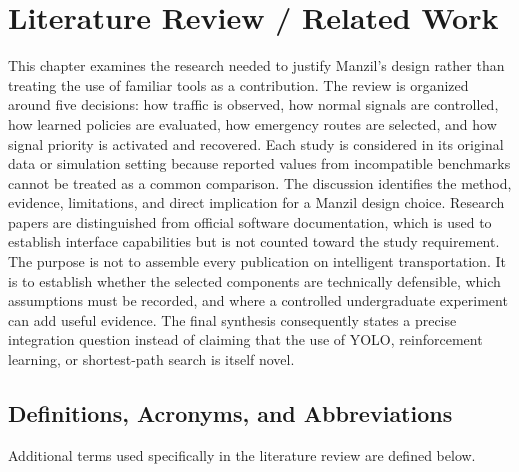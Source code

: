 \chapter{Literature Review / Related Work}
\label{ch:literature}

This chapter examines the research needed to justify Manzil's design rather than treating the use of familiar tools as a contribution. The review is organized around five decisions: how traffic is observed, how normal signals are controlled, how learned policies are evaluated, how emergency routes are selected, and how signal priority is activated and recovered. Each study is considered in its original data or simulation setting because reported values from incompatible benchmarks cannot be treated as a common comparison. The discussion identifies the method, evidence, limitations, and direct implication for a Manzil design choice. Research papers are distinguished from official software documentation, which is used to establish interface capabilities but is not counted toward the study requirement. The purpose is not to assemble every publication on intelligent transportation. It is to establish whether the selected components are technically defensible, which assumptions must be recorded, and where a controlled undergraduate experiment can add useful evidence. The final synthesis consequently states a precise integration question instead of claiming that the use of YOLO, reinforcement learning, or shortest-path search is itself novel.

\section{Definitions, Acronyms, and Abbreviations}

Additional terms used specifically in the literature review are defined below.

